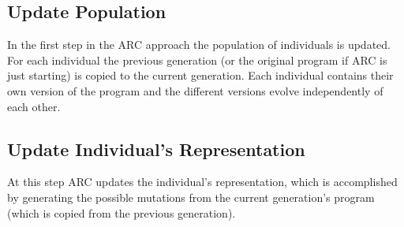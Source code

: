 \subsection{Update Population}
\label{sec:update_population}

In the first step in the ARC approach the population of individuals is updated. For each
individual the previous generation (or the original program if ARC is just
starting) is copied to the current generation. Each individual contains their
own version of the program and the different versions evolve independently of each other.


\subsection{Update Individual's Representation}
\label{sec:update_individual_representation}

At this step ARC updates the individual's representation, which is accomplished
by generating the possible mutations from the current generation's program (which
is copied from the previous generation).




